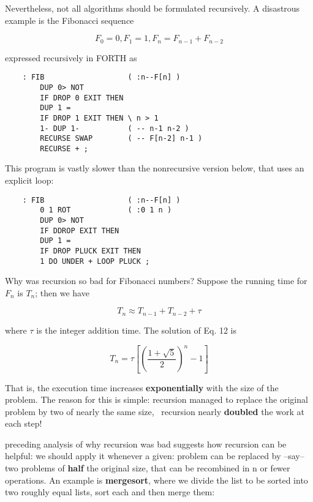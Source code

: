 Nevertheless, not all algorithms should be formulated recursively. A disastrous example is the Fibonacci sequence

\begin{equation}
F_0 = 0, F_1 = 1, F_n = F_{n-1} + F_{n-2}
\end{equation}

expressed recursively in FORTH as
\begin{lstlisting}
    : FIB                   ( :n--F[n] )
        DUP 0> NOT
        IF DROP 0 EXIT THEN
        DUP 1 = 
        IF DROP 1 EXIT THEN \ n > 1
        1- DUP 1-           ( -- n-1 n-2 )
        RECURSE SWAP        ( -- F[n-2] n-1 )
        RECURSE + ;
\end{lstlisting}

This program is vastly slower than the nonrecursive version below, that uses an explicit  loop:
\begin{lstlisting}
    : FIB                   ( :n--F[n] )
        0 1 ROT             ( :0 1 n )
        DUP 0> NOT
        IF DDROP EXIT THEN
        DUP 1 =
        IF DROP PLUCK EXIT THEN
        1 DO UNDER + LOOP PLUCK ;
\end{lstlisting}
Why was recursion so bad for Fibonacci numbers? Suppose the running time for $F_n$ is $T_n$; then we have

\begin{equation}
T_{n} \approx T_{n-1} + T_{n-2} + \tau
\end{equation}

where $\tau$ is the integer addition time. The solution of Eq. 12 is

\begin{equation}
T_{n} = \tau\left[\left(\frac{1+\sqrt{5}}{2}\right)^n - 1\right]
\end{equation}

That is, the execution time increases \textbf{exponentially} with the size of the problem. The reason for this is simple: recursion managed to replace the original problem by two of nearly the same size, \ie\ recursion nearly \textbf{doubled} the work at each step!

 preceding analysis of why recursion was bad suggests how recursion can be helpful: we should apply it whenever a given: problem can be replaced by --say-- two problems of \textbf{half} the original size, that can be recombined in n or fewer operations. An example is \textbf{mergesort}, where we divide the list to be sorted into two roughly equal lists, sort each and then merge them:

